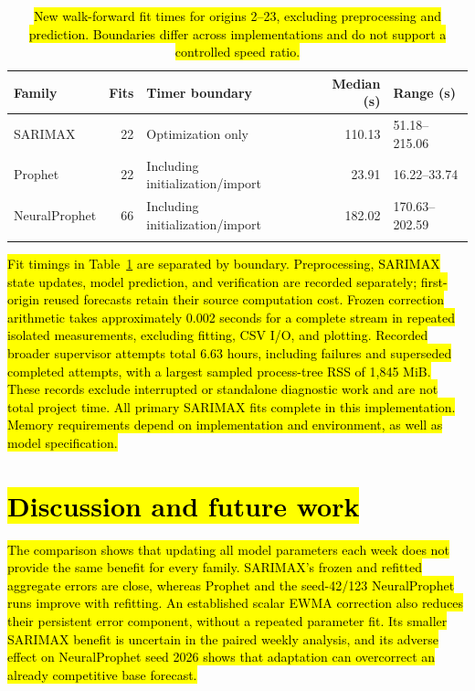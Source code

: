 \documentclass[pdflatex,sn-basic,Numbered]{sn-jnl}
\newcommand{\rev}[1]{\hl{#1}}
\begin{document}
\begin{table}[htbp]
\caption{\rev{New walk-forward fit times for origins 2--23, excluding preprocessing and prediction. Boundaries differ across implementations and do not support a controlled speed ratio.}}
\label{tab:timing}
\begingroup\small\setlength{\tabcolsep}{4pt}
\begin{tabularx}{\linewidth}{@{}lrlrX@{}}
\toprule
Family & Fits & Timer boundary & Median (s) & Range (s) \\
\midrule
SARIMAX & 22 & Optimization only & 110.13 & 51.18--215.06 \\
Prophet & 22 & Including initialization/import & 23.91 & 16.22--33.74 \\
NeuralProphet & 66 & Including initialization/import & 182.02 & 170.63--202.59 \\
\botrule
\end{tabularx}\endgroup
\end{table}

\rev{Fit timings in Table~\ref{tab:timing} are separated by boundary. Preprocessing, SARIMAX state updates, model prediction, and verification are recorded separately; first-origin reused forecasts retain their source computation cost. Frozen correction arithmetic takes approximately 0.002 seconds for a complete stream in repeated isolated measurements, excluding fitting, CSV I/O, and plotting. Recorded broader supervisor attempts total 6.63 hours, including failures and superseded completed attempts, with a largest sampled process-tree RSS of 1,845 MiB. These records exclude interrupted or standalone diagnostic work and are not total project time. All primary SARIMAX fits complete in this implementation. Memory requirements depend on implementation and environment, as well as model specification.}

\section{\texorpdfstring{\rev{Discussion and future work}}{Discussion and future work}}

\rev{The comparison shows that updating all model parameters each week does not provide the same benefit for every family. SARIMAX's frozen and refitted aggregate errors are close, whereas Prophet and the seed-42/123 NeuralProphet runs improve with refitting. An established scalar EWMA correction also reduces their persistent error component, without a repeated parameter fit. Its smaller SARIMAX benefit is uncertain in the paired weekly analysis, and its adverse effect on NeuralProphet seed 2026 shows that adaptation can overcorrect an already competitive base forecast.}
\end{document}
